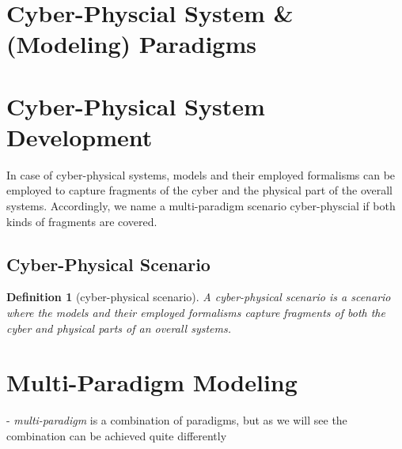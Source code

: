\documentclass[a4paper,8pt]{article}
\newtheorem{definition}{\bf Definition}
\begin{document}
\section{Cyber-Physcial System \& (Modeling) Paradigms}	

\section{Cyber-Physical System Development}

In case of cyber-physical systems, models and their employed formalisms can be employed to capture fragments of the cyber and the physical part of the overall systems. Accordingly, we name a multi-paradigm scenario cyber-physcial if both kinds of fragments are covered. 

\subsection{Cyber-Physical Scenario}

\begin{definition}[cyber-physical scenario]
A \emph{cyber-physical scenario} is a scenario where the models and their employed formalisms capture fragments of both the cyber and  physical parts of an overall systems. 
\end{definition}



\section{Multi-Paradigm Modeling}

- \emph{multi-paradigm} is a combination of paradigms, but as we will see the combination can be achieved quite differently

	
\end{document}
